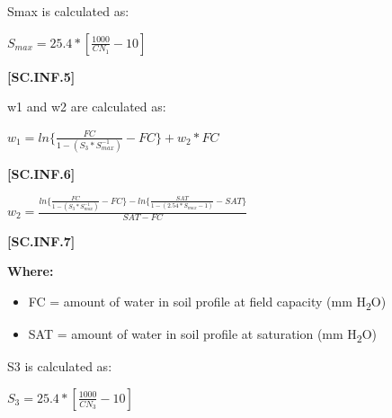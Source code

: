 Smax is calculated as:
            \vspace{0.5cm}

    \begin{center}
 \( S_{max}=25.4 * [\frac{1000}{CN_1}-10]	\)
    \end{center}
        \vspace{0.5cm} 
    
            {\raggedleft \textbf{[SC.INF.5]}\par}
            \vspace{0.5cm}

w1 and w2 are calculated as:

    \begin{center}
 \( w_1=ln \{ \frac{FC}{1-(S_3 * S_{max}^{-1})}-FC \}+w_2 * FC	 \)
    \end{center}
        \vspace{0.5cm} 
    
            {\raggedleft \textbf{[SC.INF.6]}\par}
            \vspace{0.5cm}
            

    \begin{center}
 \( w_2= \frac{ln \{ \frac{FC}{1-(S_3 * S_{max}^{-1})}-FC \} -ln \{ \frac{SAT}{1-(2.54 * S_{max}-1)}-SAT \} }{SAT-FC} \)
    \end{center}
        \vspace{0.5cm} 
    
            {\raggedleft \textbf{[SC.INF.7]}\par}
            \vspace{0.5cm}

        \textbf{Where:}
            
        \begin{itemize}
            \item FC	=	amount of water in soil profile at field capacity (mm H\textsubscript{2}O)
            \item SAT	=	amount of water in soil profile at saturation (mm H\textsubscript{2}O)
        \end{itemize}
\vspace{0.2cm}

S3 is calculated as:
            \vspace{0.5cm}
            

    \begin{center}
 \( S_3=25.4 * [\frac{1000}{CN_3}-10]	\)
    \end{center}
        \vspace{0.5cm} 
    
